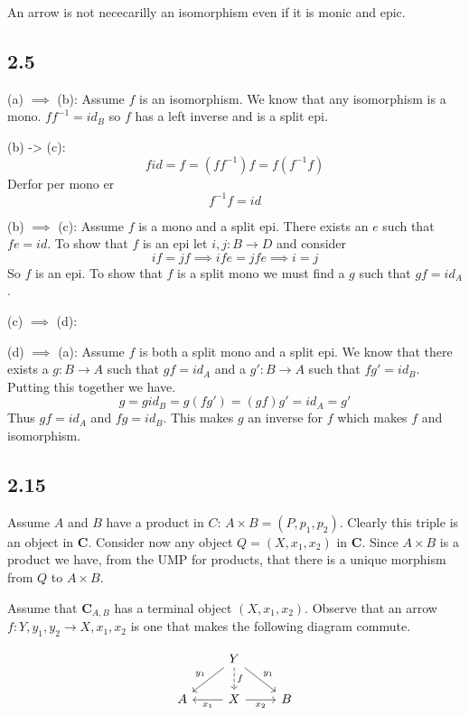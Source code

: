 \documentclass{book}
\theoremstyle{definition}
\newcommand{\arr}[3]{#1 : #2 \rightarrow #3}
\newcommand\id{\mathit{id}}
\begin{document}
An arrow is not nececarilly an isomorphism even if it is monic and epic.

\subsection{2.5}

(a) $\implies$ (b): Assume $f$ is an isomorphism. We know that any isomorphism
is a mono. $f f^{-1} = \id_B$ so $f$ has a left inverse and is a split epi.

(b) -> (c): \[ f \id = f = (f f^{-1}) f = f (f^{-1} f)  \] Derfor per mono er
\[ f^{-1} f = \id \]

(b) $\implies$ (c): Assume $f$ is a mono and a split epi. There exists an $e$
such that $fe = \id$. To show that $f$ is an epi let $\arr{i, j}{B}{D}$ and
consider
\[
  if = jf \implies ife = jfe \implies i = j
\]
So $f$ is an epi. To show that $f$ is a split mono we must find a $g$ such that
$gf = id_A$.

(c) $\implies$ (d):

(d) $\implies$ (a): Assume $f$ is both a split mono and a split epi. We know
that there exists a $\arr{g}{B}{A}$ such that $gf = \id_A$ and a
$\arr{g'}{B}{A}$ such that $fg' = \id_B$. Putting this together we have.
\[
  g = g \id_B = g (f g') = (g f) g' = \id_A = g'
\]
Thus $gf = \id_A$ and $fg = \id_B$. This makes $g$ an inverse for $f$ which
makes $f$ and isomorphism.

\subsection{2.15}

Assume $A$ and $B$ have a product in $C$: $A \times B = (P, p_1, p_2)$. Clearly
this triple is an object in $\mathbf{C}$. Consider now any object $Q = (X, x_1,
x_2)$ in $\mathbf{C}$. Since $A \times B$ is a product we have, from the UMP for
products, that there is a unique morphism from $Q$ to $A \times B$.

Assume that $\mathbf{C}_{A, B}$ has a terminal object $(X, x_1, x_2)$. Observe
that an arrow $\arr{f}{Y, y_1, y_2}{X, x_1, x_2}$ is one that makes the
following diagram commute.

\[
  \begin{tikzcd}
    & Y \arrow[ld, "y_1"'] \arrow[d, dashrightarrow, "f"] \arrow[rd, "y_1"] \\
    A & X \arrow[l, "x_1"] \arrow[r, "x_2"'] & B
  \end{tikzcd}
\]
\end{document}
